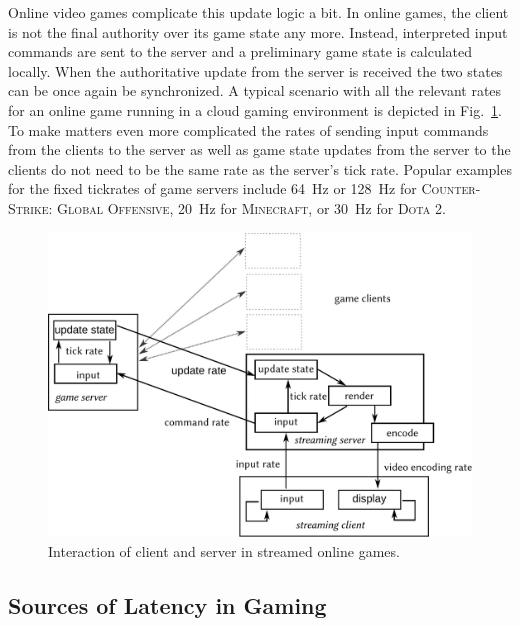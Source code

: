 Online video games complicate this update logic a bit. In online games, the client is not the final authority over its game state any more. Instead, interpreted input commands are sent to the server and a preliminary game state is calculated locally. When the authoritative update from the server is received the two states can be once again be synchronized. A typical scenario with all the relevant rates for an online game running in a cloud gaming environment is depicted in Fig.~\ref{fig:tickrate-streamed}. To make matters even more complicated the rates of sending input commands from the clients to the server as well as game state updates from the server to the clients do not need to be the same rate as the server's tick rate. Popular examples for the fixed tickrates of game servers include \SI{64}{\hertz} or \SI{128}{\hertz} for \textsc{Counter-Strike: Global Offensive}, \SI{20}{\hertz} for \textsc{Minecraft}, or \SI{30}{\hertz} for \textsc{Dota 2}.

\begin{figure}[!t]
	\centering
	\includegraphics[width=1.0\columnwidth]{../models/game-tick-rate-streamed.pdf}
	\caption{Interaction of client and server in streamed online games.}
\label{fig:tickrate-streamed}
\end{figure}


\subsection{Sources of Latency in Gaming}
\label{sec:latency}

